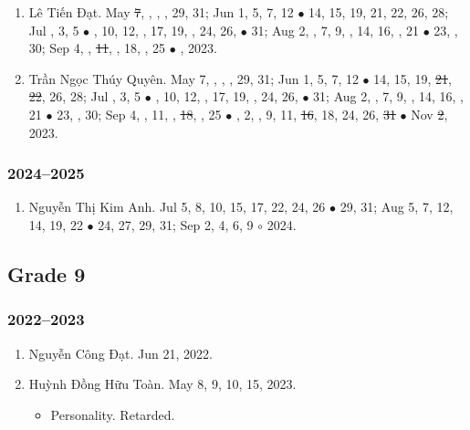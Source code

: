 \documentclass{article}
\begin{document}
\begin{enumerate}
	\item {\sc Lê Tiến Đạt.} May \st{7}, , , , 29, 31; Jun 1, 5, 7, 12 $\bullet$ 14, 15, 19, 21, 22, 26, 28; Jul , 3, 5 $\bullet$ , 10, 12, , 17, 19, , 24, 26,  $\bullet$ 31; Aug 2, , 7, 9, , 14, 16, , 21 $\bullet$ 23, , 30; Sep 4, , \st{11}, , 18, , 25 $\bullet$ , 2023. {\sf[Out]}
	\item {\sc Trần Ngọc Thúy Quyên.} May 7, , , , 29, 31; Jun 1, 5, 7, 12 $\bullet$ 14, 15, 19, \st{21}, \st{22}, 26, 28; Jul , 3, 5 $\bullet$ , 10, 12, , 17, 19, , 24, 26,  $\bullet$ 31; Aug 2, , 7, 9, , 14, 16, , 21 $\bullet$ 23, , 30; Sep 4, , 11, , \st{18}, , 25 $\bullet$ , 2, , 9, 11, \st{16}, 18, 24, 26, \st{31} $\bullet$ Nov \st{2}, 2023.
\end{enumerate}

\subsubsection{2024--2025}

\begin{enumerate}
	\item {\sc Nguyễn Thị Kim Anh.} Jul 5, 8, 10, 15, 17, 22, 24, 26 $\bullet$ 29, 31; Aug 5, 7, 12, 14, 19, 22 $\bullet$ 24, 27, 29, 31; Sep 2, 4, 6, 9 $\circ$ 2024.
\end{enumerate}


\subsection{Grade 9}

\subsubsection{2022--2023}

\begin{enumerate}
	\item {\sc Nguyễn Công Đạt.} {\sf[In]} Jun 21, 2022. {\sf[Out]}
	\item {\sc Huỳnh Đồng Hữu Toàn.} {\sf[In]} May 8, 9, 10, 15, 2023. {\sf[Out]}
	\begin{itemize}
		\item {\sf Personality.} Retarded.
	\end{itemize}
\end{enumerate}
\end{document}
